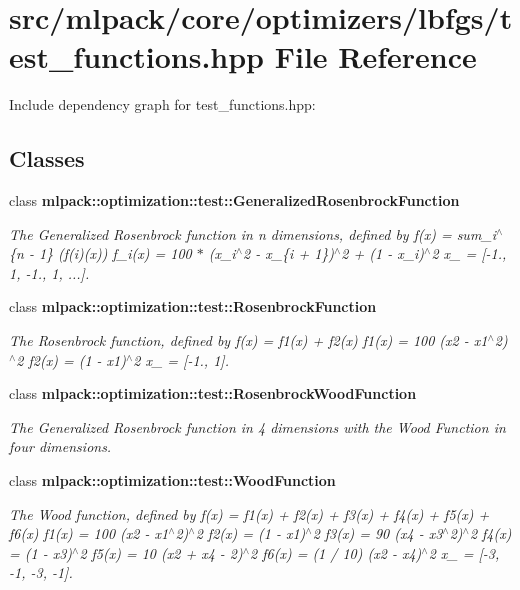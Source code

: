 \section{src/mlpack/core/optimizers/lbfgs/test\-\_\-functions.hpp File Reference}
\label{test__functions_8hpp}
Include dependency graph for test\-\_\-functions.\-hpp\-:
\subsection*{Classes}
\begin{DoxyCompactItemize}
\item 
class {\bf mlpack\-::optimization\-::test\-::\-Generalized\-Rosenbrock\-Function}
\begin{DoxyCompactList}\small\item\em The Generalized Rosenbrock function in n dimensions, defined by f(x) = sum\-\_\-i$^\wedge$\{n -\/ 1\} (f(i)(x)) f\-\_\-i(x) = 100 $\ast$ (x\-\_\-i$^\wedge$2 -\/ x\-\_\-\{i + 1\})$^\wedge$2 + (1 -\/ x\-\_\-i)$^\wedge$2 x\-\_ = [-\/1., 1, -\/1., 1, ...]. \end{DoxyCompactList}\item 
class {\bf mlpack\-::optimization\-::test\-::\-Rosenbrock\-Function}
\begin{DoxyCompactList}\small\item\em The Rosenbrock function, defined by f(x) = f1(x) + f2(x) f1(x) = 100 (x2 -\/ x1$^\wedge$2)$^\wedge$2 f2(x) = (1 -\/ x1)$^\wedge$2 x\-\_ = [-\/1., 1]. \end{DoxyCompactList}\item 
class {\bf mlpack\-::optimization\-::test\-::\-Rosenbrock\-Wood\-Function}
\begin{DoxyCompactList}\small\item\em The Generalized Rosenbrock function in 4 dimensions with the Wood Function in four dimensions. \end{DoxyCompactList}\item 
class {\bf mlpack\-::optimization\-::test\-::\-Wood\-Function}
\begin{DoxyCompactList}\small\item\em The Wood function, defined by f(x) = f1(x) + f2(x) + f3(x) + f4(x) + f5(x) + f6(x) f1(x) = 100 (x2 -\/ x1$^\wedge$2)$^\wedge$2 f2(x) = (1 -\/ x1)$^\wedge$2 f3(x) = 90 (x4 -\/ x3$^\wedge$2)$^\wedge$2 f4(x) = (1 -\/ x3)$^\wedge$2 f5(x) = 10 (x2 + x4 -\/ 2)$^\wedge$2 f6(x) = (1 / 10) (x2 -\/ x4)$^\wedge$2 x\-\_ = [-\/3, -\/1, -\/3, -\/1]. \end{DoxyCompactList}\end{DoxyCompactItemize}
